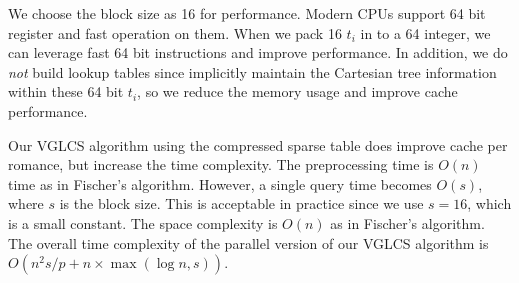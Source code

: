 We choose the block size as 16 for performance.  Modern CPUs support
64 bit register and fast operation on them.  When we pack 16 $t_i$ in
to a 64 integer, we can leverage fast 64 bit instructions and improve
performance.  In addition, we do {\em not} build lookup tables since
implicitly maintain the Cartesian tree information within these 64
bit $t_i$, so we reduce the memory usage and improve cache
performance.

\iffalse 因所有 $t_i < 16$，使得每個 $l_i$ 可用 4-bit 表示之，整體便可
用 64-bit 長整數表示一棵笛卡爾樹的狀態。為了現在常見的 64-byte 快取列
(cache line) 和 64-bit 暫存器 (register) 考量，我們選用合適的大小進行
測試，不僅壓縮空間使用量，同時也減少快取未中的問題。最後，我們得到壓縮
算法 \ref{alg:cartesian-to-64bits}，其相對應的區間查找算法，根據
Demaine \cite{demaine} 進行修改，得到壓縮下的詢問算法
\ref{alg:cartesian64bits-query}。\fi

Our VGLCS algorithm using the compressed sparse table does improve
cache per romance, but increase the time complexity.  The
preprocessing time is $O(n)$ time as in Fischer's algorithm.  However,
a single query time becomes $O(s)$, where $s$ is the block size.  This
is acceptable in practice since we use $s = 16$, which is a small
constant.  The space complexity is $O(n)$ as in Fischer's algorithm.
The overall time complexity of the parallel version of our VGLCS
algorithm is $O(n^2 s / p + n \times \max(\log n, s))$.

\iffalse
回到 VGLCS 的應用中，上述算法使用壓縮方式降低快取未中。
我們可以使用上述的算法取代原先的并查集，建表的時間複雜度為 $O(n)$，
單一查詢的時間複雜度為 $O(s)$。
整體的時間複雜度為 $O(n^2 \; s / p + n \max(\log n, s))$。
\fi
